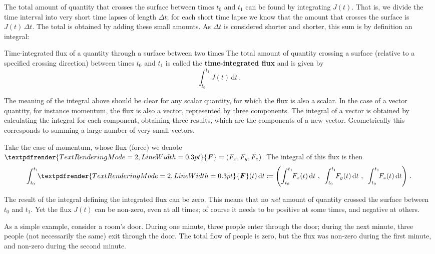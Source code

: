 \documentclass[a4paper,12pt,%
onecolumn,oneside,titlepage,%
british%
]{memoir}
\renewcommand*{\bm}[1]{\textpdfrender{TextRenderingMode=2,LineWidth=0.3pt}{\boldsymbol{#1}}}
\newcommand*{\di}{\mathrm{d}}%
\newcommand*{\incr}{\Delta}%
\newcommand*{\defd}{\coloneqq}
\renewcommand*{\|}[1][]{\nonscript\:#1\vert\nonscript\:\mathopen{}}
\newcommand*{\yJ}{J}
\newcommand*{\yF}{\bm{F}}
\newcommand*{\yti}{t_{0}}
\newcommand*{\ytf}{t_{1}}
\newcommand*{\Dt}{\incr t}
\begin{document}
The total amount of quantity that crosses the surface between times $\yti$ and $\ytf$ can be found by integrating $\yJ(t)$. That is, we divide the time interval into very short time lapses of length $\Dt$; for each short time lapse we know that the amount that crosses the surface is $\yJ(t)\,\Dt$. The total is obtained by adding these small amounts. As $\Dt$ is considered shorter and shorter, this sum is by definition an integral:
\begin{definition}{Time-integrated flux of a quantity through a surface between two times}
The total amount of quantity crossing a surface (relative to a specified crossing direction) between times $\yti$ and $\ytf$ is called the \textbf{time-integrated flux} and is given by
  \begin{equation}
    \label{eq:total_flow_integral}
     \int_{\yti}^{\ytf}\!\! \yJ(t)\,\di t\ .
  \end{equation}
\end{definition}

The meaning of the integral above should be clear for any scalar quantity, for which the flux is also a scalar. In the case of a vector quantity, for instance momentum, the flux is also a vector, represented by three components. The integral of a vector is obtained by calculating the integral for each component, obtaining three results, which are the components of a new vector. Geometrically this corresponds to summing a large number of very small vectors.

Take the case of momentum, whose flux (force) we denote $\yF=(F_{x}, F_{y}, F_{z})$. The integral of this flux is then
\begin{equation}
  \label{eq:total_flow_integral_vector}
  \int_{\yti}^{\ytf}\!\! \yF(t)\,\di t \defd
  \Biggl(
  \int_{\yti}^{\ytf}\!\! F_{x}(t)\,\di t \ ,\enspace
  \int_{\yti}^{\ytf}\!\! F_{y}(t)\,\di t \ ,\enspace
  \int_{\yti}^{\ytf}\!\! F_{z}(t)\,\di t
  \Biggr) \ .
\end{equation}

\medskip

\begin{warning}
  The result of the integral defining the integrated flux can be zero. This means that no \emph{net} amount of quantity crossed the surface between $\yti$ and $\ytf$. Yet the flux $\yJ(t)$ can be non-zero, even at all times; of course it needs to be positive at some times, and negative at others.
\end{warning}
As a simple example, consider a room's door. During one minute, three people enter through the door; during the next minute, three people (not necessarily the same) exit through the door. The total flow of people is zero, but the flux was non-zero during the first minute, and non-zero during the second minute.
\end{document}
